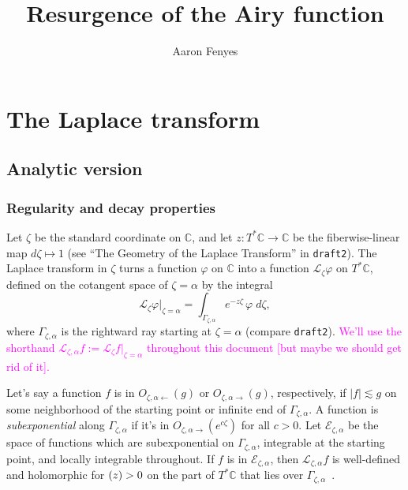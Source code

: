 \documentclass{article}
\title{Resurgence of the Airy function}
\author{Aaron Fenyes}
\theoremstyle{plain}
\newcommand{\maps}{\colon}
\newcommand{\C}{\mathbb{C}}
\let\Re\relax
\DeclareMathOperator{\Re}{Re}
\newcommand{\laplace}{\mathcal{L}}
\begin{document}
\maketitle
\section{The Laplace transform}
\subsection{Analytic version}
\subsubsection{Regularity and decay properties}\label{reg-decay}
Let $\zeta$ be the standard coordinate on $\C$, and let $z \maps T^*\C \to \C$ be the fiberwise-linear map $d\zeta \mapsto 1$ (see ``The Geometry of the Laplace Transform'' in {\tt draft2}). The Laplace transform in $\zeta$ turns a function $\varphi$ on $\C$ into a function $\laplace_\zeta \varphi$ on $T^*\C$, defined on the cotangent space of $\zeta = \alpha$ by the integral
\[ \laplace_\zeta \varphi \big|_{\zeta = \alpha} = \int_{\Gamma_{\zeta, \alpha}} e^{-z \zeta}\,\varphi\;d\zeta, \]
where $\Gamma_{\zeta, \alpha}$ is the rightward ray starting at $\zeta = \alpha$ (compare {\tt draft2}). \textcolor{magenta}{We'll use the shorthand $\laplace_{\zeta, \alpha} f := \laplace_\zeta f \big|_{\zeta = \alpha}$ throughout this document [but maybe we should get rid of it].}

Let's say a function $f$ is in $O_{\zeta, \alpha \leftarrow}(g)$ or $O_{\zeta, \alpha \rightarrow}(g)$, respectively, if $|f| \lesssim g$ on some neighborhood of the starting point or infinite end of $\Gamma_{\zeta, \alpha}$. A function is {\em subexponential} along $\Gamma_{\zeta, \alpha}$ if it's in $O_{\zeta, \alpha \rightarrow}(e^{c\zeta})$ for all $c > 0$. Let $\mathcal{E}_{\zeta, \alpha}$ be the space of functions which are subexponential on $\Gamma_{\zeta, \alpha}$, integrable at the starting point, and locally integrable throughout. If $f$ is in $\mathcal{E}_{\zeta, \alpha}$, then $\laplace_{\zeta, \alpha} f$ is well-defined and holomorphic for $\Re(z) > 0$ on the part of $T^*\C$ that lies over $\Gamma_{\zeta, \alpha}$~\cite[\S 5.6]{diverg-resurg-i}.
\end{document}
